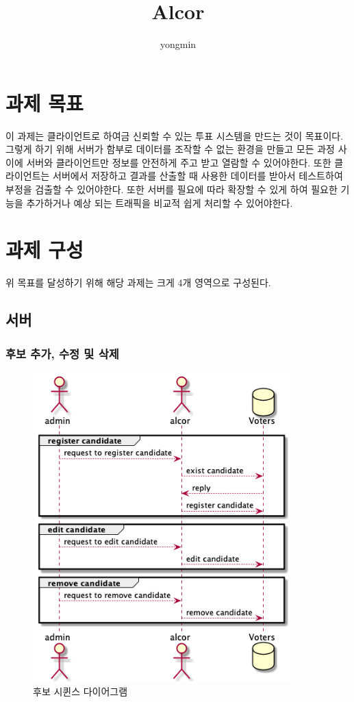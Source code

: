\documentclass[11pt,a4paper,left=15mm,right=15mm,top=20mm,bottom=20mm]{article}
\title{Alcor}
\author{yongmin}
\begin{document}
\maketitle

\tableofcontents
\listoffigures

\newpage

\section{과제 목표}

이 과제는 클라이언트로 하여금 신뢰할 수 있는 투표 시스템을 만드는 것이 목표이다. 그렇게 하기 위해 서버가 함부로 데이터를 조작할 수 없는 환경을 만들고 모든 과정 사이에 서버와 클라이언트만 정보를 안전하게 주고 받고 열람할 수 있어야한다. 또한 클라이언트는 서버에서 저장하고 결과를 산출할 때 사용한 데이터를 받아서 테스트하여 부정을 검출할 수 있어야한다. 또한 서버를 필요에 따라 확장할 수 있게 하여 필요한 기능을 추가하거나 예상 되는 트래픽을 비교적 쉽게 처리할 수 있어야한다.

\section{과제 구성}

위 목표를 달성하기 위해 해당 과제는 크게 4개 영역으로 구성된다.

    \subsection{서버}

        \subsubsection{후보 추가, 수정 및 삭제}

        \begin{figure}[h]
            \begin{center}
                \includegraphics[width=10cm]{candidate-reg}
                \caption{후보 시퀸스 다이어그램}
            \end{center}
        \end{figure}
\end{document}
